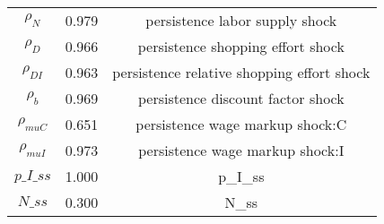 \begin{center}
\begin{longtable}{ccc}
${\rho_N}$ 	 & 	 0.979 	 & 	 persistence labor supply shock\\
${\rho_D}$ 	 & 	 0.966 	 & 	 persistence shopping effort shock\\
${\rho_{DI}}$ 	 & 	 0.963 	 & 	 persistence relative shopping effort shock\\
${\rho_b}$ 	 & 	 0.969 	 & 	 persistence discount factor shock\\
${\rho_{muC}}$ 	 & 	 0.651 	 & 	 persistence wage markup shock:C\\
${\rho_{muI}}$ 	 & 	 0.973 	 & 	 persistence wage markup shock:I\\
$p\_I\_ss$ 	 & 	 1.000 	 & 	 p\_I\_ss\\
$N\_ss$ 	 & 	 0.300 	 & 	 N\_ss\\
\bottomrule%
\end{longtable}
\end{center}
